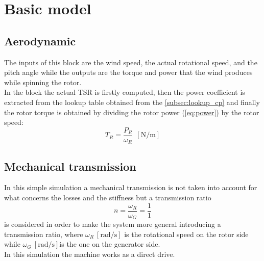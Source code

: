 \newpage
\section{Basic model}\label{sec:c_basic_model_model}
\subsection{Aerodynamic}
The inputs of this block are the wind speed, the actual rotational speed, and the pitch angle while the outputs are the torque and power that the wind produces while spinning the rotor. \\
In the block the actual \acrshort{TSR} is firstly computed, then the power coefficient is extracted from the lookup table obtained from the \autoref{subsec:lookup_cp} and finally the rotor torque is obtained by dividing the rotor power (\autoref{eq:power}) by the rotor speed:
\begin{equation}
    T_R = \frac{P_R}{\omega_R} \ \ \left[\si{\newton\per\meter}\right]
\end{equation}

\subsection{Mechanical transmission}
In this simple simulation a mechanical transmission is not taken into account for what concerns the losses and the stiffness but a transmission ratio 
\begin{equation}
    n = \frac{\omega_{R}}{\omega_{G}} = \frac{1}{1}
    \label{eq:transmission_ratio}
\end{equation}
is considered in order to make the system more general introducing a transmission ratio, where $\omega_{R} \ \left[\si{\radian\per\second}\right]$ is the rotational speed on the rotor side while $\omega_{G} \ \left[\si{\radian\per\second}\right]$is the one on the generator side.\\
In this simulation the machine works as a direct drive.


